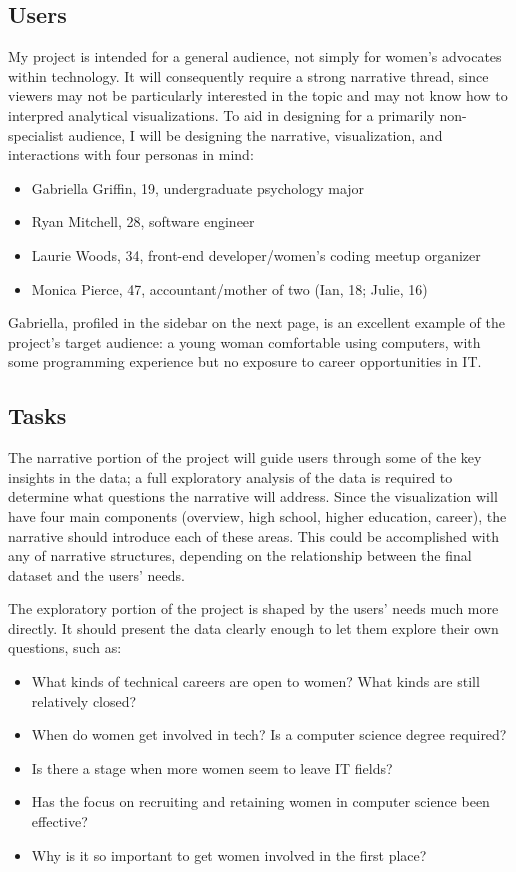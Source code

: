 \subsection{Users}\label{users}
My project is intended for a general audience, not simply for women’s advocates within technology. It will consequently require a strong narrative thread, since viewers may not be particularly interested in the topic and may not know how to interpred analytical visualizations. To aid in designing for a primarily non-specialist audience, I will be designing the narrative, visualization, and interactions with four personas in mind:
\begin{itemize}
  \item Gabriella Griffin, 19, undergraduate psychology major
  \item Ryan Mitchell, 28, software engineer
  \item Laurie Woods, 34, front-end developer/women’s coding meetup organizer
  \item Monica Pierce, 47, accountant/mother of two (Ian, 18; Julie, 16)
\end{itemize}

Gabriella, profiled in the sidebar on the next page, is an excellent example of the project’s target audience: a young woman comfortable using computers, with some programming experience but no exposure to career opportunities in IT\@.


\subsection{Tasks}\label{tasks}
The narrative portion of the project will guide users through some of the key insights in the data; a full exploratory analysis of the data is required to determine what questions the narrative will address. Since the visualization will have four main components (overview, high school, higher education, career), the narrative should introduce each of these areas. This could be accomplished with any of \citet{SegelHeer2010Narrative} narrative structures, depending on the relationship between the final dataset and the users’ needs.

The exploratory portion of the project is shaped by the users’ needs much more directly. It should present the data clearly enough to let them explore their own questions, such as:

\begin{itemize}
  \item What kinds of technical careers are open to women? What kinds are still relatively closed?
  \item When do women get involved in tech? Is a computer science degree required?
  \item Is there a stage when more women seem to leave IT fields?
  \item Has the focus on recruiting and retaining women in computer science been effective?
  \item Why is it so important to get women involved in the first place?
\end{itemize}

